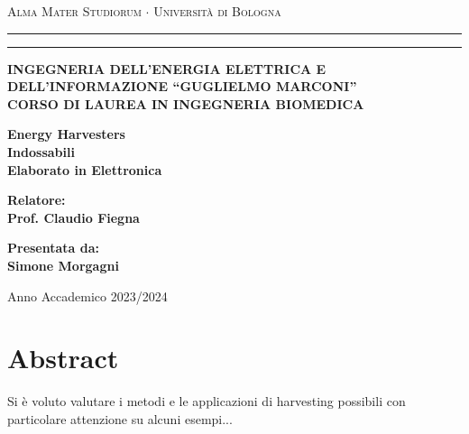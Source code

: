 \documentclass[12pt,a4paper]{extreport}
\begin{document}
\begin{titlepage}
    \topmargin=-50pt
    \begin{center}
    {{\Large{\textsc{Alma Mater Studiorum $\cdot$ Universit\`a di
    Bologna}}}} \rule[0.1cm]{15.8cm}{0.1mm}
    \rule[0.5cm]{15.8cm}{0.6mm}
    {{\bf INGEGNERIA DELL’ENERGIA ELETTRICA E DELL’INFORMAZIONE 
    “GUGLIELMO MARCONI”\\
    \small CORSO DI LAUREA IN INGEGNERIA BIOMEDICA}}
    \end{center}
    \vspace{15mm}
    \begin{center}
    {\LARGE{\bf Energy Harvesters}}\\
    \vspace{3mm}
    {\LARGE{\bf Indossabili}}\\
    \vspace{2cm}
    {\large{\bf Elaborato in Elettronica}}
    \end{center}
    \vspace{7cm}
    \par
    \noindent
    \begin{minipage}[t]{0.47\textwidth}
    {\large{\bf Relatore:\\
    Prof. Claudio Fiegna}}
    \end{minipage}
    \hfill
    \begin{minipage}[t]{0.47\textwidth}\raggedleft
    {\large{\bf Presentata da:\\
    Simone Morgagni}}
    \end{minipage}
    \vspace{20mm}
    \begin{center}
    {Anno Accademico 2023/2024}
    \end{center}
\end{titlepage}

\tableofcontents
{}

\chapter*{Abstract}
{Si \`e voluto valutare i metodi e le applicazioni di harvesting possibili con particolare attenzione su alcuni esempi...}







\end{document}
